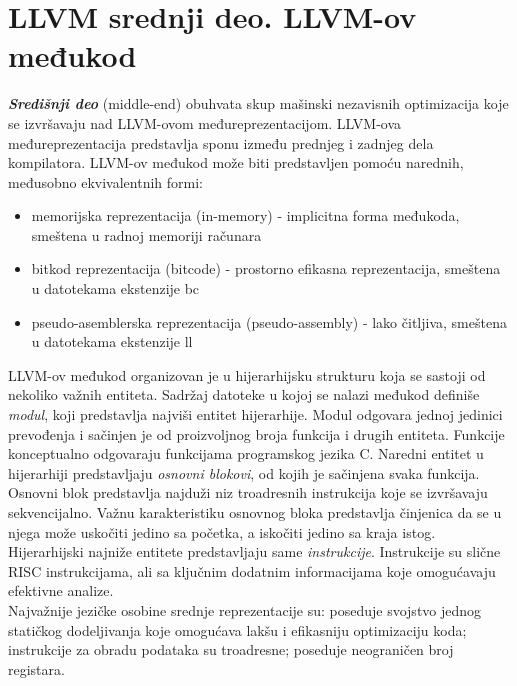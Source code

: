 \documentclass[10pt]{extarticle}
\begin{document}
\section{LLVM srednji deo. LLVM-ov međukod}
\noindent
\textit{\textbf{Središnji deo}} (middle-end) obuhvata skup mašinski nezavisnih optimizacija koje se izvršavaju nad LLVM-ovom međureprezentacijom. LLVM-ova međureprezentacija predstavlja sponu između prednjeg i zadnjeg dela kompilatora.
LLVM-ov međukod može biti predstavljen pomoću narednih, međusobno ekvivalentnih formi:
\begin{itemize}
    \item memorijska reprezentacija (in-memory) - implicitna forma međukoda, smeštena u radnoj memoriji računara
    \item bitkod reprezentacija (bitcode) - prostorno efikasna reprezentacija, smeštena u datotekama ekstenzije bc
    \item pseudo-asemblerska reprezentacija (pseudo-assembly) - lako čitljiva, smeštena u datotekama ekstenzije ll
\end{itemize}
LLVM-ov međukod organizovan je u hijerarhijsku strukturu koja se sastoji od nekoliko važnih entiteta. Sadržaj datoteke u kojoj se nalazi međukod definiše \textit{modul}, koji predstavlja najviši entitet hijerarhije. Modul odgovara jednoj jedinici prevođenja i sačinjen je od proizvoljnog broja funkcija i drugih entiteta.
Funkcije konceptualno odgovaraju funkcijama programskog jezika C. Naredni entitet u hijerarhiji predstavljaju \textit{osnovni blokovi}, od kojih je sačinjena svaka funkcija. Osnovni blok predstavlja najduži niz troadresnih instrukcija koje se izvršavaju sekvencijalno. Važnu karakteristiku osnovnog bloka predstavlja činjenica da se u njega može uskočiti jedino sa početka, a iskočiti jedino sa kraja istog. Hijerarhijski najniže entitete predstavljaju same \textit{instrukcije}.
Instrukcije su slične RISC instrukcijama, ali sa ključnim dodatnim informacijama koje omogućavaju efektivne analize. \\
Najvažnije jezičke osobine srednje reprezentacije su: poseduje svojstvo jednog statičkog dodeljivanja koje omogućava lakšu i efikasniju optimizaciju koda; instrukcije za obradu podataka su troadresne; poseduje neograničen broj registara.
 
\end{document}
